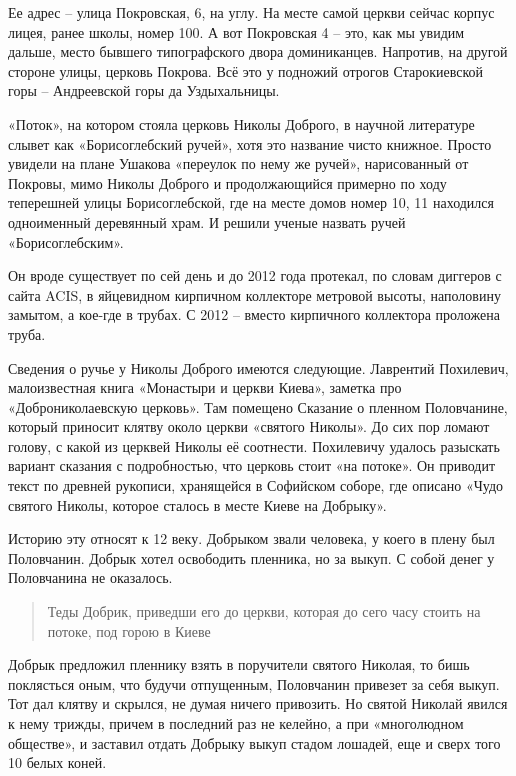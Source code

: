 Ее адрес – улица Покровская, 6, на углу. На месте самой церкви сейчас корпус лицея, ранее школы, номер 100. А вот Покровская 4 – это, как мы увидим дальше, место бывшего типографского двора доминиканцев. Напротив, на другой стороне улицы, церковь Покрова. Всё это у подножий отрогов Старокиевской горы – Андреевской горы да Уздыхальницы.

«Поток», на котором стояла церковь Николы Доброго, в научной литературе слывет как «Борисоглебский ручей», хотя это название чисто книжное. Просто увидели на плане Ушакова «переулок по нему же ручей», нарисованный от Покровы, мимо Николы Доброго и продолжающийся примерно по ходу теперешней улицы Борисоглебской, где на месте домов номер 10, 11 находился одноименный деревянный храм. И решили ученые назвать ручей «Борисоглебским».

Он вроде существует по сей день и до 2012 года протекал, по словам диггеров с сайта ACIS, в яйцевидном кирпичном коллекторе метровой высоты, наполовину замытом, а кое-где в трубах. С 2012 – вместо кирпичного коллектора проложена труба.

Сведения о ручье у Николы Доброго имеются следующие. Лаврентий Похилевич, малоизвестная книга «Монастыри и церкви Киева»\cite{pohilmon}, заметка про «Доброниколаевскую церковь». Там помещено Сказание о пленном Половчанине, который приносит клятву около церкви «святого Николы». До сих пор ломают голову, с какой из церквей Николы её соотнести. Похилевичу удалось разыскать вариант сказания с подробностью, что церковь стоит «на потоке». Он приводит текст по древней рукописи, хранящейся в Софийском соборе, где описано «Чудо святого Николы, которое сталось в месте Киеве на Добрыку».

Историю эту относят к 12 веку. Добрыком звали человека, у коего в плену был Половчанин. Добрык хотел освободить пленника, но за выкуп. С собой денег у Половчанина не оказалось.

\begin{quotation}
Теды Добрик, приведши его до церкви, которая до сего часу стоить на потоке, под горою в Киеве
\end{quotation}

Добрык предложил пленнику взять в поручители святого Николая, то бишь поклясться оным, что будучи отпущенным, Половчанин привезет за себя выкуп. Тот дал клятву и скрылся, не думая ничего привозить. Но святой Николай явился к нему трижды, причем в последний раз не келейно, а при «многолюдном обществе», и заставил отдать Добрыку выкуп стадом лошадей, еще и сверх того 10 белых коней.

